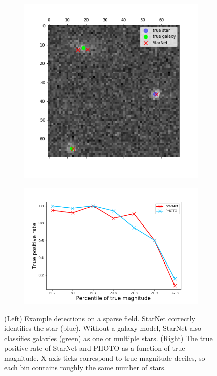 \begin{figure}
    \centering
    \begin{subfigure}{0.45\textwidth}
        \includegraphics[width=\textwidth]{figures/sparse_field_detections.png}
        \subcaption{}
    \end{subfigure}
    \begin{subfigure}{0.54\textwidth}
        \includegraphics[width=\textwidth]{figures/sparse_field_tpr.png}
        \subcaption{}
    \end{subfigure}
    \caption{(Left) Example detections on a sparse field. StarNet correctly identifies the star (blue). 
    Without a galaxy model, StarNet also classifies galaxies (green) as one or multiple stars.
    (Right) The true positive rate of StarNet and PHOTO as a function of true magnitude.
    X-axis ticks correspond to true magnitude deciles, so each bin contains roughly the same number of stars.}
    \label{fig:sparse_field}
\end{figure}
